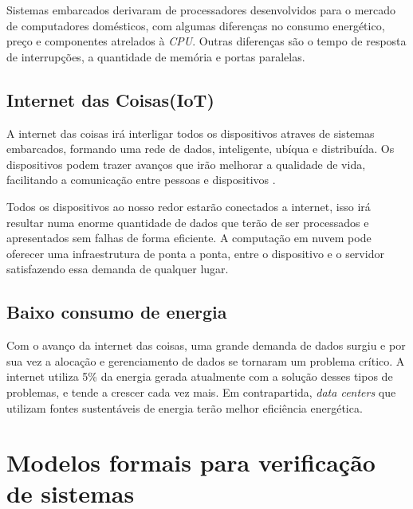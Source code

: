Sistemas embarcados derivaram de processadores desenvolvidos para o mercado de computadores domésticos, com algumas diferenças no consumo energético, preço e componentes atrelados à \textit{CPU}. Outras diferenças são o tempo de resposta de interrupções, a quantidade de memória e portas paralelas.
\cite{schlett:1998}


\subsection{Internet das Coisas(IoT)}

A internet das coisas irá interligar todos os dispositivos atraves de sistemas embarcados, formando uma rede de dados, inteligente, ubíqua e distribuída. Os dispositivos podem trazer avanços que irão melhorar a qualidade de vida, facilitando a comunicação entre pessoas e dispositivos \cite{xia:2012}.

Todos os dispositivos ao nosso redor estarão conectados a internet, isso irá resultar numa enorme quantidade de dados que terão de ser processados e apresentados sem falhas de forma eficiente. A computação em nuvem pode oferecer uma infraestrutura  de ponta a ponta, entre o dispositivo e o servidor satisfazendo essa demanda de qualquer lugar.\cite{Gubbi:2013} 

\subsection{Baixo consumo de energia}
Com o avanço da internet das coisas, uma grande demanda de dados surgiu e por sua vez a alocação e gerenciamento de dados se tornaram um problema crítico. A internet utiliza 5\% da energia gerada atualmente com a solução desses tipos de problemas, e tende a crescer cada vez mais. Em contrapartida, \textit{data centers} que utilizam fontes sustentáveis de energia terão melhor eficiência energética.\cite{Gubbi:2013} 

\section{Modelos formais para verificação de sistemas}
 

